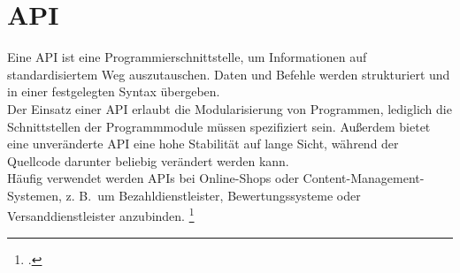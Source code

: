 \section{\acl{API}}
Eine \acs{API} ist eine Programmierschnittstelle, um Informationen auf standardisiertem Weg auszutauschen. Daten und Befehle werden strukturiert und in einer festgelegten Syntax übergeben.\\
Der Einsatz einer \acs{API} erlaubt die Modularisierung von Programmen, lediglich die Schnittstellen der Programmmodule müssen spezifiziert sein. Außerdem bietet eine unveränderte \acs{API} eine hohe Stabilität auf lange Sicht, während der Quellcode darunter beliebig verändert werden kann.\\
Häufig verwendet werden APIs bei Online-Shops oder Content-Management-Systemen, z. B.~um Bezahldienstleister, Bewertungssysteme oder Versanddienstleister anzubinden.
\footcite[Vgl.][o. \pno]{Luber_2017_API}

